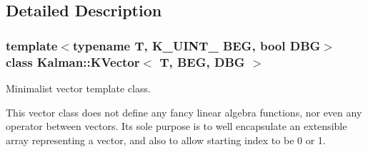 \subsection{Detailed Description}
\subsubsection*{template$<$typename T, K\+\_\+\+U\+I\+N\+T\+\_ B\+EG, bool D\+BG$>$\newline
class Kalman\+::\+K\+Vector$<$ T, B\+E\+G, D\+B\+G $>$}

Minimalist vector template class. 

This vector class does not define any fancy linear algebra functions, nor even any operator between vectors. Its sole purpose is to well encapsulate an extensible array representing a vector, and also to allow starting index to be 0 or 1.


